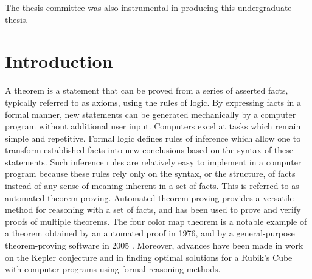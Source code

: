 \documentclass{article}
\begin{document}
The thesis committee was also instrumental in producing this undergraduate thesis.

	\newpage
	\listoffigures

	\newpage
	\tableofcontents

	\newpage
	\setcounter{page}{1}
	\section{Introduction}



A theorem is a statement that can be proved from a series of asserted facts, typically referred to as axioms, using the rules of logic. By expressing facts in a formal manner, new statements can be generated mechanically by a computer program without additional user input. Computers excel at tasks which remain simple and repetitive. Formal logic defines rules of inference which allow one to transform established facts into new conclusions based on the syntax of these statements. Such inference rules are relatively easy to implement in a computer program because these rules rely only on the syntax, or the structure, of facts instead of any sense of meaning inherent in a set of facts. This is referred to as automated theorem proving. Automated theorem proving provides a versatile method for reasoning with a set of facts, and has been used to prove and verify proofs of multiple theorems. The four color map theorem is a notable example of a theorem obtained by an automated proof in 1976, and by a general-purpose theorem-proving software in 2005 \cite{gonthier2008formal}. Moreover, advances have been made in work on the Kepler conjecture and in finding optimal solutions for a Rubik's Cube with computer programs using formal reasoning methods. 
\end{document}
